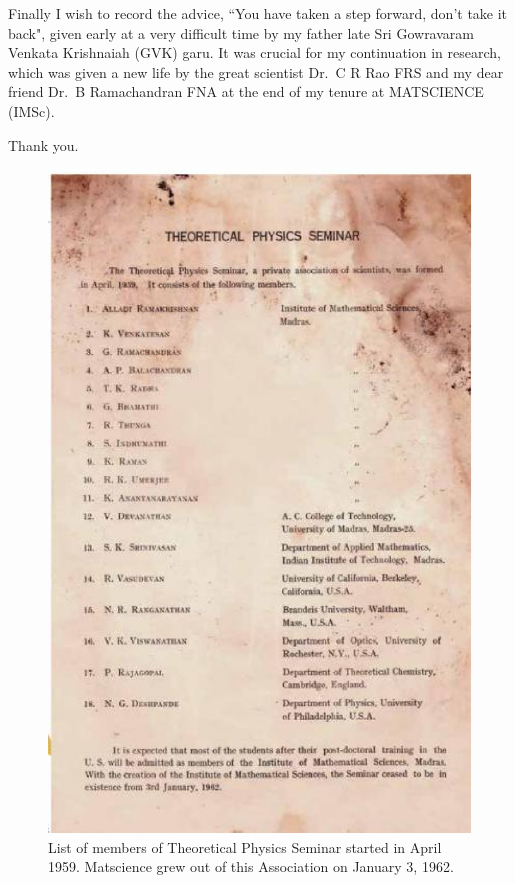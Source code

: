 Finally I wish to record the advice, ``You have taken a step forward, don’t take it
back", given early at a very difficult time by my father late Sri Gowravaram Venkata
Krishnaiah (GVK) garu. It was crucial for my continuation in research, which was given a new life by the
great scientist Dr.\ C R Rao FRS and my dear friend Dr.\ B Ramachandran FNA at
the end of my tenure at MATSCIENCE (IMSc).
\bigskip

\hfill
Thank you.
\newpage


\begin{figure}[H]
\centering
\includegraphics[scale=0.65]{src/images/chap25/1.eps}
\caption{List of members of Theoretical Physics Seminar started in April 1959. Matscience grew out of
this Association on January 3, 1962.}
\end{figure}

